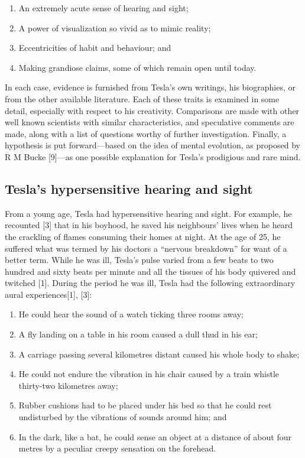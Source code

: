 \documentclass[
  12pt,
  british,
  a4paper,
]{article}
\providecommand{\tightlist}{%
  \setlength{\itemsep}{0pt}\setlength{\parskip}{0pt}}
\begin{document}
\begin{enumerate}
\tightlist
\item
  An extremely acute sense of hearing and sight;
\item
  A power of visualization so vivid as to mimic reality;
\item
  Eccentricities of habit and behaviour; and
\item
  Making grandiose claims, some of which remain open until today.
\end{enumerate}

In each case, evidence is furnished from Tesla's own writings, his
biographies, or from the other available literature. Each of these
traits is examined in some detail, especially with respect to his
creativity. Comparisons are made with other well known scientists with
similar characteristics, and speculative comments are made, along with a
list of questions worthy of further investigation. Finally, a hypothesis
is put forward---based on the idea of mental evolution, as proposed by R
M Bucke {[}9{]}---as one possible explanation for Tesla's prodigious and
rare mind.

\hypertarget{teslas-hypersensitive-hearing-and-sight}{%
\subsection{Tesla's hypersensitive hearing and
sight}\label{teslas-hypersensitive-hearing-and-sight}}

From a young age, Tesla had hypersensitive hearing and sight. For
example, he recounted {[}3{]} that in his boyhood, he saved his
neighbours' lives when he heard the crackling of flames consuming their
homes at night. At the age of 25, he suffered what was termed by his
doctors a ``nervous breakdown'' for want of a better term. While he was
ill, Tesla's pulse varied from a few beats to two hundred and sixty
beats per minute and all the tissues of his body quivered and twitched
{[}1{]}. During the period he was ill, Tesla had the following
extraordinary aural experiences{[}1{]}, {[}3{]}:

\begin{enumerate}
\item
  He could hear the sound of a watch ticking three rooms away;
\item
  A fly landing on a table in his room caused a dull thud in his ear;
\item
  A carriage passing several kilometres distant caused his whole body to
  shake;
\item
  He could not endure the vibration in his chair caused by a train
  whistle thirty-two kilometres away;
\item
  Rubber cushions had to be placed under his bed so that he could rest
  undisturbed by the vibrations of sounds around him; and
\item
  In the dark, like a bat, he could sense an object at a distance of
  about four metres by a peculiar creepy sensation on the forehead.
\end{enumerate}
\end{document}

